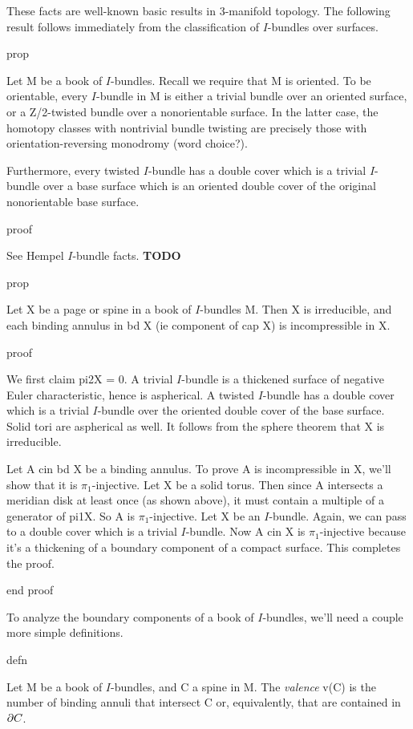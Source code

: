These facts are well-known basic results in 3-manifold topology.  The following
result follows immediately from the classification of $I$-bundles over surfaces.

prop

Let M be a book of $I$-bundles. Recall we require that M is oriented. To be
orientable, every $I$-bundle in M is either a trivial bundle over an oriented
surface, or a Z/2-twisted bundle over a nonorientable surface. In the latter
case, the homotopy classes with nontrivial bundle twisting are precisely those
with orientation-reversing monodromy (word choice?).

Furthermore, every twisted $I$-bundle has a double cover which is a trivial
$I$-bundle over a base surface which is an oriented double cover of the original
nonorientable base surface.

proof

See Hempel $I$-bundle facts. {\bf TODO}

prop

Let X be a page or spine in a book of $I$-bundles M. Then X is irreducible, and
each binding annulus in bd X (ie component of \cA cap X) is incompressible in X.

proof

We first claim pi2X = 0. A trivial $I$-bundle is a thickened surface of negative
Euler characteristic, hence is aspherical. A twisted $I$-bundle has a double
cover which is a trivial $I$-bundle over the oriented double cover of the base
surface. Solid tori are aspherical as well. It follows from the sphere theorem
that X is irreducible.

Let A cin bd X be a binding annulus. To prove A is incompressible in X, we'll
show that it is $\pi_1$-injective. Let X be a solid torus. Then since A intersects
a meridian disk at least once (as shown above), it must contain a multiple of
a generator of pi1X. So A is $\pi_1$-injective. Let X be an $I$-bundle. Again, we can
pass to a double cover which is a trivial $I$-bundle. Now A cin X is
$\pi_1$-injective because it's a thickening of a boundary component of a compact
surface. This completes the proof.

end proof

To analyze the boundary components of a book of $I$-bundles, we'll need
a couple more simple definitions.

defn

Let M be a book of $I$-bundles, and C a spine in M.  The \emph{valence} v(C) is
the number of binding annuli that intersect C or, equivalently, that are
contained in $\partial C$.

